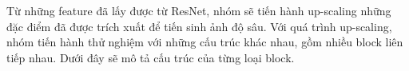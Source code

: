 Từ những feature đã lấy được từ ResNet, nhóm sẽ tiến hành up-scaling những đặc điểm đã được trích xuất để tiến sinh ảnh độ sâu. Với quá trình up-scaling, nhóm tiến hành thử nghiệm với những cấu trúc khác nhau, gồm nhiều block liên tiếp nhau. Dưới đây sẽ mô tả cấu trúc của từng loại block.


